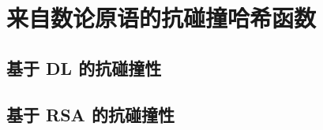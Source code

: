 \section{来自数论原语的抗碰撞哈希函数}\label{sec:10-6}

\subsection{基于 DL 的抗碰撞性}\label{subsec:10-6-1}

\subsection{基于 RSA 的抗碰撞性}\label{subsec:10-6-2}
